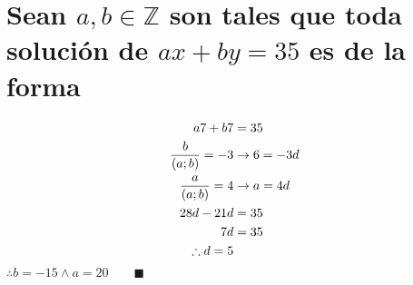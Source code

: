 \section{Sean $a,b \in \mathbb{Z}$ son tales que toda solución de $ax+by = 35$ es de la forma } %
    \begin{align}
        \notag a7 + b7 &= 35 \\
        \notag \frac{b}{(a;b)} = -3 &\rightarrow 6 = -3d \\
        \notag \frac{a}{(a;b)} = 4 &\rightarrow a = 4d \\
        \notag 28d - 21d &= 35  \\
        \notag 7d &= 35 \\
        \notag \therefore d = 5
    \end{align}
    $\therefore b = -15 \wedge a = 20 \qquad \blacksquare$